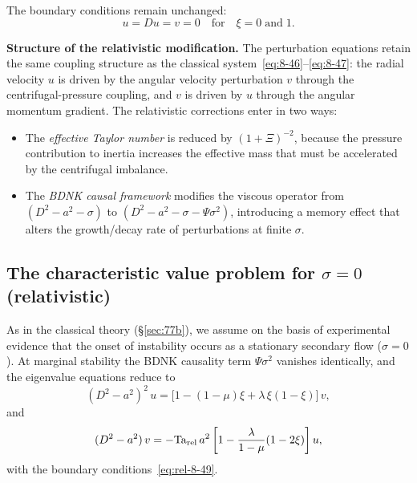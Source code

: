 The boundary conditions remain unchanged:
\begin{equation}
\label{eq:rel-8-49}
u = Du = v = 0 \quad\text{for}\quad \xi = 0 \;\text{and}\; 1.
\end{equation}

\begin{relcorrection}
\textbf{Structure of the relativistic modification.}
The perturbation equations retain the same coupling structure as the
classical system~\eqref{eq:8-46}--\eqref{eq:8-47}: the radial
velocity $u$ is driven by the angular velocity perturbation $v$
through the centrifugal-pressure coupling, and $v$ is driven by $u$
through the angular momentum gradient.  The relativistic corrections
enter in two ways:
\begin{itemize}
\item The \emph{effective Taylor number} is reduced by $(1+\Xi)^{-2}$,
  because the pressure contribution to inertia increases the effective
  mass that must be accelerated by the centrifugal imbalance.
\item The \emph{BDNK causal framework} modifies the viscous
  operator from $(D^2 - a^2 - \sigma)$ to
  $(D^2 - a^2 - \sigma - \Psi\sigma^2)$, introducing a memory
  effect that alters the growth/decay rate of perturbations at
  finite $\sigma$.
\end{itemize}
\end{relcorrection}

\subsection{The characteristic value problem for $\sigma = 0$
  (relativistic)}
\label{sec:rel-77b}

As in the classical theory (\S\ref{sec:77b}), we assume on the basis
of experimental evidence that the onset of instability occurs as a
stationary secondary flow ($\sigma = 0$).  At marginal stability the
BDNK causality term $\Psi\sigma^2$ vanishes identically,
and the eigenvalue equations reduce to
\begin{equation}
\label{eq:rel-8-50}
(D^2 - a^2)^2\,u
= \bigl[1 - (1-\mu)\xi + \lambda\,\xi(1-\xi)\bigr]\,v,
\end{equation}
and
\begin{equation}
\label{eq:rel-8-51}
(D^2 - a^2)\,v
= -\mathrm{Ta}_{\mathrm{rel}}\,a^2\,\biggl[1 - \frac{\lambda}{1-\mu}(1-2\xi)\biggr]\,u,
\end{equation}
with the boundary conditions~\eqref{eq:rel-8-49}.

